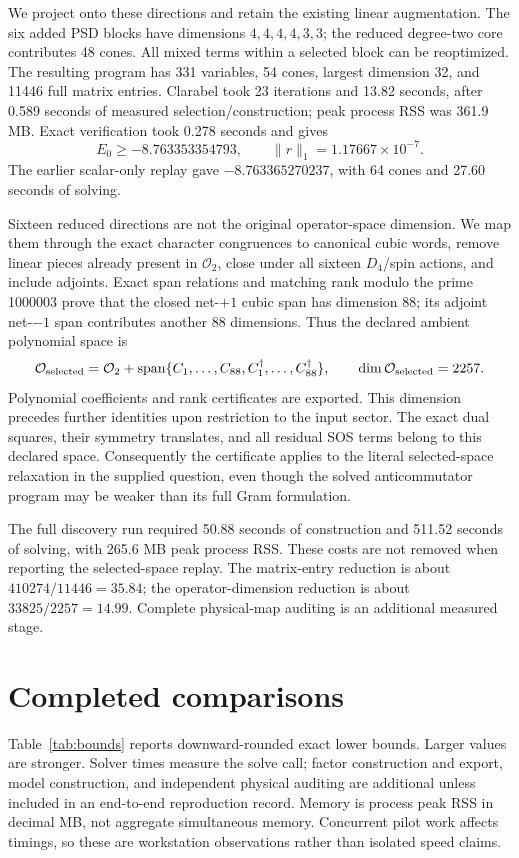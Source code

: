 \documentclass[11pt]{article}
\newcommand{\Span}{\operatorname{span}}
\begin{document}
We project onto these directions and retain the existing linear augmentation. The six added PSD blocks have dimensions $4,4,4,4,3,3$; the reduced degree-two core contributes 48 cones. All mixed terms within a selected block can be reoptimized. The resulting program has 331 variables, 54 cones, largest dimension 32, and 11446 full matrix entries. Clarabel took 23 iterations and 13.82 seconds, after 0.589 seconds of measured selection/construction; peak process RSS was 361.9 MB. Exact verification took 0.278 seconds and gives
\begin{equation}
 E_0\ge -8.763353354793,\qquad \|r\|_1=1.17667\times10^{-7}.
\end{equation}
The earlier scalar-only replay gave $-8.763365270237$, with 64 cones and 27.60 seconds of solving.

Sixteen reduced directions are not the original operator-space dimension. We map them through the exact character congruences to canonical cubic words, remove linear pieces already present in $\mathcal O_2$, close under all sixteen $D_4$/spin actions, and include adjoints. Exact span relations and matching rank modulo the prime 1000003 prove that the closed net-$+1$ cubic span has dimension 88; its adjoint net-$-1$ span contributes another 88 dimensions. Thus the declared ambient polynomial space is
\begin{equation}
 \mathcal O_{\rm selected}=\mathcal O_2+\Span\{C_1,\ldots,C_{88},C_1^\dagger,\ldots,C_{88}^\dagger\},
 \qquad\dim\mathcal O_{\rm selected}=2257.
\end{equation}
Polynomial coefficients and rank certificates are exported. This dimension precedes further identities upon restriction to the input sector. The exact dual squares, their symmetry translates, and all residual SOS terms belong to this declared space. Consequently the certificate applies to the literal selected-space relaxation in the supplied question, even though the solved anticommutator program may be weaker than its full Gram formulation.

The full discovery run required 50.88 seconds of construction and 511.52 seconds of solving, with 265.6 MB peak process RSS. These costs are not removed when reporting the selected-space replay. The matrix-entry reduction is about $410274/11446=35.84$; the operator-dimension reduction is about $33825/2257=14.99$. Complete physical-map auditing is an additional measured stage.

\section{Completed comparisons}
Table~\ref{tab:bounds} reports downward-rounded exact lower bounds. Larger values are stronger. Solver times measure the solve call; factor construction and export, model construction, and independent physical auditing are additional unless included in an end-to-end reproduction record. Memory is process peak RSS in decimal MB, not aggregate simultaneous memory. Concurrent pilot work affects timings, so these are workstation observations rather than isolated speed claims.
\end{document}
